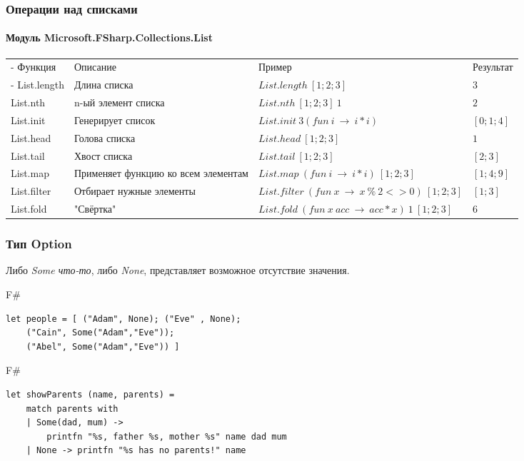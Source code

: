\documentclass[xetex,mathserif,serif]{beamer}
\begin{document}
	\begin{frame}
		\frametitle{Операции над списками}
		\framesubtitle{Модуль Microsoft.FSharp.Collections.List}
		\begin{small}
			\begin{tabu} {| X[0.5 l p] | X[1 l p] | X[1 l p] | X[0.5 l p] |}
				\tabucline-
				Функция                & Описание                            & Пример                                              & Результат                        \\
				\tabucline-
				\everyrow{\tabucline-}
				List.length            & Длина списка                        & $List.length\ [1;2;3]$                              & $3$          \\
				List.nth               & n-ый элемент списка                 & $List.nth\ [1; 2; 3]\ 1$                            & $2$          \\
				List.init              & Генерирует список                   & $List.init\ 3 (fun\ i\ \rightarrow\ i * i)$         & $[0; 1; 4]$          \\
				List.head              & Голова списка                       & $List.head\ [1; 2; 3]$                              & $1$          \\
				List.tail              & Хвост списка                        & $List.tail\ [1; 2; 3]$                              & $[2; 3]$          \\
				List.map               & Применяет функцию ко всем элементам & $List.map\ (fun\ i\ \rightarrow\ i * i)\ [1; 2; 3]$ & $[1; 4; 9]$          \\
				List.filter            & Отбирает нужные элементы            & $List.filter\ (fun\ x\ \rightarrow\ x\ \%\ 2 <> 0)\ [1; 2; 3]$ & $[1; 3]$          \\
				List.fold              & "Свёртка"  & $List.fold\ (fun\ x\ acc\ \rightarrow\ acc * x)\ 1\ [1; 2; 3]$               & $6$
			\end{tabu}
		\end{small}
	\end{frame}
	
	\begin{frame}[fragile]
		\frametitle{Тип Option}
		Либо \textit{Some что-то}, либо \textit{None}, представляет возможное отсутствие значения.
		\begin{exampleblock}{F\#}
			\begin{lstlisting}
let people = [ ("Adam", None); ("Eve" , None);
    ("Cain", Some("Adam","Eve"));
    ("Abel", Some("Adam","Eve")) ]
            \end{lstlisting}
		\end{exampleblock}
		\begin{exampleblock}{F\#}
			\begin{lstlisting}
let showParents (name, parents) =
    match parents with
    | Some(dad, mum) -> 
        printfn "%s, father %s, mother %s" name dad mum
    | None -> printfn "%s has no parents!" name
            \end{lstlisting}
		\end{exampleblock}
\end{frame}
\end{document}
